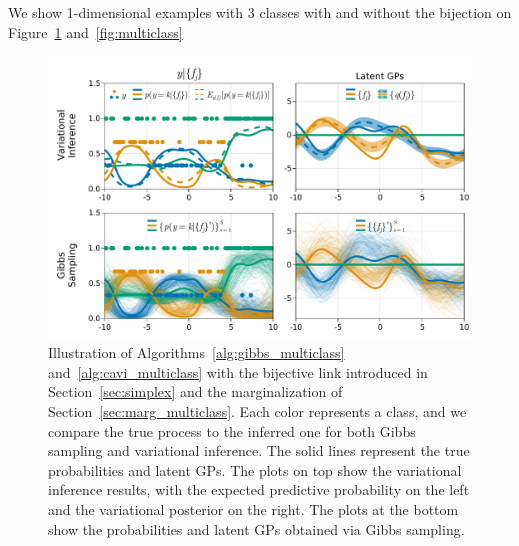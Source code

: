 We show 1-dimensional examples with 3 classes with and without the bijection on Figure~\ref{fig:bijective_multiclass} and~\ref{fig:multiclass}

\begin{figure}
    \includegraphics[width=\textwidth]{./chapters/8_discussions/figures/categorical_bijective.pdf}
    \caption{Illustration of Algorithms~\ref{alg:gibbs_multiclass} and~\ref{alg:cavi_multiclass} with the bijective link introduced in Section~\ref{sec:simplex} and the marginalization of Section~\ref{sec:marg_multiclass}.
    Each color represents a class, and we compare the true process to the inferred one for both Gibbs sampling and variational inference.
    The solid lines represent the true probabilities and latent \ac{GPs}.
    The plots on top show the variational inference results, with the expected predictive probability on the left and the variational posterior on the right.
    The plots at the bottom show the probabilities and latent GPs obtained via Gibbs sampling.}
    \label{fig:bijective_multiclass}
\end{figure}
